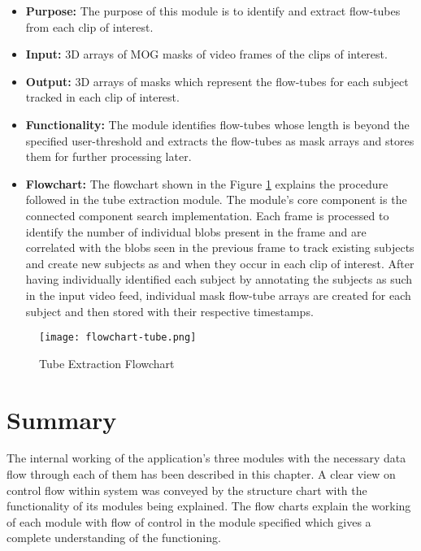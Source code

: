     \begin{itemize}
        \item \textbf{Purpose:} The purpose of this module is to identify and
        extract flow-tubes from each clip of interest.
        \item \textbf{Input:} 3D arrays of MOG masks of video frames of the
        clips of interest.
        \item \textbf{Output:} 3D arrays of masks which represent the flow-tubes
        for each subject tracked in each clip of interest.
        \item \textbf{Functionality:} The module identifies flow-tubes whose
        length is beyond the specified user-threshold and extracts the
        flow-tubes as mask arrays and stores them for further processing later.
        \item \textbf{Flowchart:} The flowchart shown in the Figure
        \ref{img:flowchart-tube} explains the procedure followed in the tube
        extraction module. The module’s core component is the connected
        component search implementation. Each frame is processed to identify
        the number of individual blobs present in the frame and are correlated
        with the blobs seen in the previous frame to track existing subjects
        and create new subjects as and when they occur in each clip of interest.
        After having individually identified each subject by annotating the
        subjects as such in the input video feed, individual mask flow-tube
        arrays are created for each subject and then stored with their
        respective timestamps.
    \end{itemize}

    \begin{figure}[H]
        \centering
        \texttt{[image: flowchart-tube.png]}
        \caption{Tube Extraction Flowchart}
        \label{img:flowchart-tube}
    \end{figure}

\section{Summary}
The internal working of the application’s three modules with the necessary data
flow through each of them has been described in this chapter. A clear view on
control flow within system was conveyed by the structure chart with the
functionality of its modules being explained. The flow charts explain the
working of each module with flow of control in the module specified which gives
a complete understanding of the functioning.